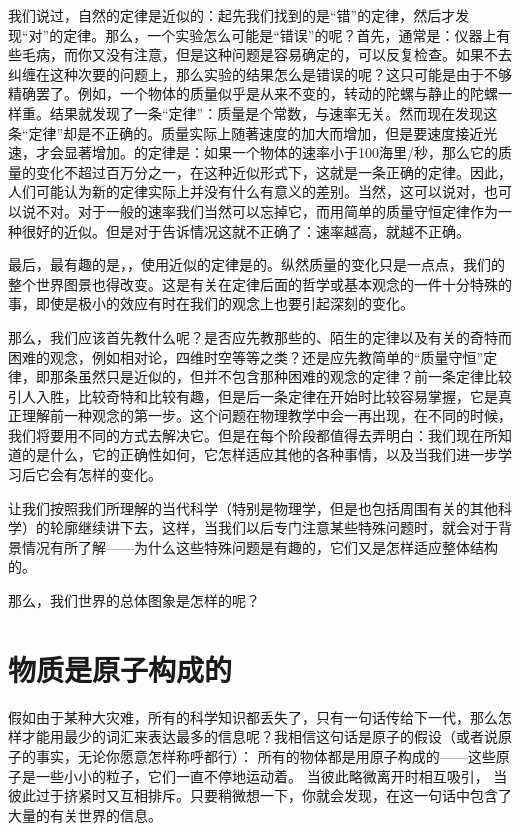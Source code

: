 我们说过，自然的定律是近似的：起先我们找到的是“错”的定律，然后才发现“对”的定律。那么，一个实验怎么可能是“错误”的呢？首先，通常是：仪器上有些毛病，而你又没有注意，但是这种问题是容易确定的，可以反复检查。如果不去纠缠在这种次要的问题上，那么实验的结果怎么是错误的呢？这只可能是由于不够精确罢了。例如，一个物体的质量似乎是从来不变的，转动的陀螺与静止的陀螺一样重。结果就发现了一条“定律”：质量是个常数，与速率无关。然而现在发现这条“定律”却是不正确的。质量实际上随著速度的加大而增加，但是要速度接近光速，才会显著增加。的定律是：如果一个物体的速率小于100海里/秒，那么它的质量的变化不超过百万分之一，在这种近似形式下，这就是一条正确的定律。因此，人们可能认为新的定律实际上并没有什么有意义的差别。当然，这可以说对，也可以说不对。对于一般的速率我们当然可以忘掉它，而用简单的质量守恒定律作为一种很好的近似。但是对于告诉情况这就不正确了：速率越高，就越不正确。

最后，最有趣的是，，使用近似的定律是的。纵然质量的变化只是一点点，我们的整个世界图景也得改变。这是有关在定律后面的哲学或基本观念的一件十分特殊的事，即使是极小的效应有时在我们的观念上也要引起深刻的变化。

那么，我们应该首先教什么呢？是否应先教那些的、陌生的定律以及有关的奇特而困难的观念，例如相对论，四维时空等等之类？还是应先教简单的“质量守恒”定律，即那条虽然只是近似的，但并不包含那种困难的观念的定律？前一条定律比较引人入胜，比较奇特和比较有趣，但是后一条定律在开始时比较容易掌握，它是真正理解前一种观念的第一步。这个问题在物理教学中会一再出现，在不同的时候，我们将要用不同的方式去解决它。但是在每个阶段都值得去弄明白：我们现在所知道的是什么，它的正确性如何，它怎样适应其他的各种事情，以及当我们进一步学习后它会有怎样的变化。

让我们按照我们所理解的当代科学（特别是物理学，但是也包括周围有关的其他科学）的轮廓继续讲下去，这样，当我们以后专门注意某些特殊问题时，就会对于背景情况有所了解——为什么这些特殊问题是有趣的，它们又是怎样适应整体结构的。

那么，我们世界的总体图象是怎样的呢？

\section{物质是原子构成的}

假如由于某种大灾难，所有的科学知识都丢失了，只有一句话传给下一代，那么怎样才能用最少的词汇来表达最多的信息呢？我相信这句话是原子的假设（或者说原子的事实，无论你愿意怎样称呼都行）： 所有的物体都是用原子构成的——这些原子是一些小小的粒子，它们一直不停地运动着。 当彼此略微离开时相互吸引， 当彼此过于挤紧时又互相排斥。只要稍微想一下，你就会发现，在这一句话中包含了大量的有关世界的信息。

